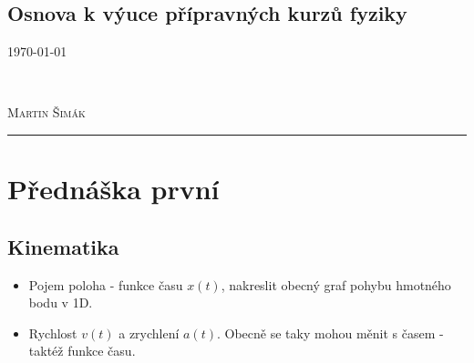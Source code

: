 \documentclass[11pt,a4paper]{article}
\begin{document}


    \begin{center}
        \section*{Osnova k výuce přípravných kurzů fyziky}
        \vspace*{-4mm}
        \begin{minipage}{0.4\textwidth}
            \begin{flushleft}
                \textsc{\today}
            \end{flushleft}
        \end{minipage}
        ~
        \begin{minipage}{0.4\textwidth}
            \begin{flushright}
                \textsc{Martin Šimák}
            \end{flushright}
        \end{minipage}
        \noindent\rule{14.5cm}{0.6pt}
    \end{center}


    \section*{Přednáška první}

        \subsection*{Kinematika}

            \begin{itemize}
                \item Pojem poloha - funkce času $x(t)$, nakreslit obecný graf pohybu hmotného bodu v 1D.
                \item Rychlost $v(t)$ a zrychlení $a(t)$. Obecně se taky mohou měnit s časem - taktéž funkce času.
            \end{itemize}
\end{document}
